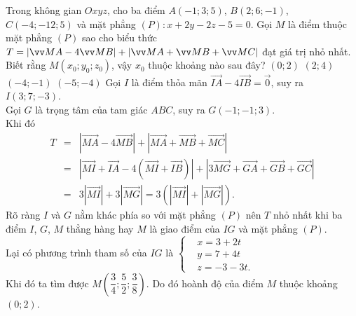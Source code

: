 \begin{ex}%
 Trong không gian $Oxyz$, cho ba điểm $A(-1;3;5)$, $B(2;6;-1)$, $C(-4;-12;5)$ và mặt phẳng $(P)\colon x+2y-2z-5=0$. Gọi $M$ là điểm thuộc mặt phẳng $(P)$ sao cho biểu thức $\break T=\left|\overrightarrow{MA}-4\overrightarrow{MB}\right|+\left|\overrightarrow{MA}+\overrightarrow{MB}+\overrightarrow{MC}\right|$ đạt giá trị nhỏ nhất. Biết rằng $M(x_0;y_0;z_0)$, vậy $x_0$ thuộc khoảng nào sau đây?
 \choice
  {\True $(0;2)$}
  {$(2;4)$}
  {$(-4;-1)$}
  {$(-5;-4)$}
 \loigiai
  {
  Gọi $I$ là điểm thỏa mãn $\overrightarrow{IA}-4\overrightarrow{IB}=\vec{0}$, suy ra $I(3;7;-3)$.\\
  Gọi $G$ là trọng tâm của tam giác $ABC$, suy ra $G(-1;-1;3)$.\\
  Khi đó
  \begin{eqnarray*}
   T &=& \left|\overrightarrow{MA}-4\overrightarrow{MB}\right|+\left|\overrightarrow{MA}+\overrightarrow{MB}+\overrightarrow{MC}\right|\\
     &=& \left|\overrightarrow{MI}+\overrightarrow{IA}-4\left(\overrightarrow{MI}+\overrightarrow{IB}\right)\right|+\left|3\overrightarrow{MG}+\overrightarrow{GA}+\overrightarrow{GB}+\overrightarrow{GC}\right|\\
     &=& 3\left|\overrightarrow{MI}\right|+3\left|\overrightarrow{MG}\right|=3\left(\left|\overrightarrow{MI}\right|+\left|\overrightarrow{MG}\right|\right).
  \end{eqnarray*}
  Rõ ràng $I$ và $G$ nằm khác phía so với mặt phẳng $(P)$ nên $T$ nhỏ nhất khi ba điểm $I$, $G$, $M$ thẳng hàng hay $M$ là giao điểm của $IG$ và mặt phẳng $(P)$.\\
  Lại có phương trình tham số của $IG$ là $\left\{\begin{aligned}&x=3+2t \\&y=7+4t \\&z=-3-3t.\end{aligned}\right.$\\
  Khi đó ta tìm được $M\left(\dfrac{3}{4};\dfrac{5}{2};\dfrac{3}{8}\right)$. Do đó hoành độ của điểm $M$ thuộc khoảng $(0;2)$.
  }
\end{ex}

